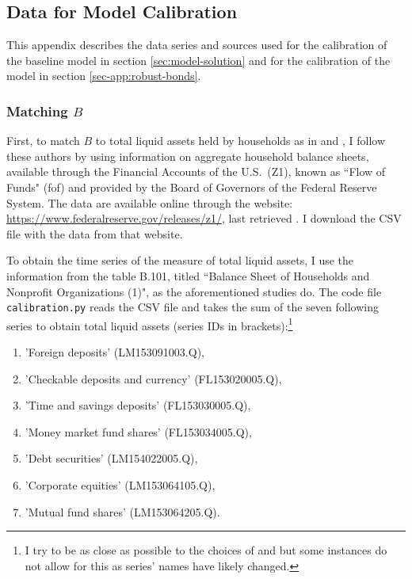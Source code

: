 \documentclass[a4paper,12pt]{article} %
\numberwithin{equation}{section} %
\numberwithin{figure}{section}
\numberwithin{table}{section}
\begin{document}
\begin{refsection}
\begin{appendices}
\section{Data for Model Calibration}
\label{sec-app:data}

This appendix describes the data series and sources used for the calibration of the baseline model in section \ref{sec:model-solution} and for the calibration of the model in section \ref{sec-app:robust-bonds}.

\subsubsection*{Matching $B$}

First, to match $B$ to total liquid assets held by households as in \textcite{mckay2016} and \textcite{gl2017}, I follow these authors by using information on aggregate household balance sheets, available through the Financial Accounts of the U.S.~(Z1), known as ``Flow of Funds" (\Gls{fof}) and provided by the Board of Governors of the Federal Reserve System. The data are available online through the website: \url{https://www.federalreserve.gov/releases/z1/}, last retrieved . I download the CSV file with the data from that website.

To obtain the time series of the measure of total liquid assets, I use the information from the table B.101, titled ``Balance Sheet of Households and Nonprofit Organizations (1)", as the aforementioned studies do. The code file \texttt{calibration.py} reads the CSV file and takes the sum of the seven following series to obtain total liquid assets (series IDs in brackets):\footnote{I try to be as close as possible to the choices of \textcite{mckay2016} and \textcite{gl2017} but some instances do not allow for this as series' names have likely changed.}
\begin{enumerate}
    \item 'Foreign deposits' (LM153091003.Q),
    \item 'Checkable deposits and currency' (FL153020005.Q),
    \item 'Time and savings deposits' (FL153030005.Q),
    \item 'Money market fund shares' (FL153034005.Q),
    \item 'Debt securities' (LM154022005.Q),
    \item 'Corporate equities' (LM153064105.Q),
    \item 'Mutual fund shares' (LM153064205.Q).
\end{enumerate}


\end{appendices}
\end{refsection}
\end{document}
